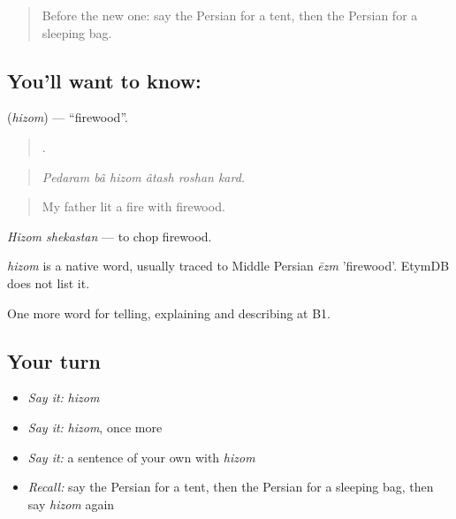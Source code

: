 \label{lesson:FA-C470-hizom}



\begin{quote}
Before the new one: say the Persian for a tent, then the Persian for a sleeping bag.
\end{quote}

\subsection*{You'll want to know: }
\textbf{} (\emph{hizom}) — \textquotedblleft{}firewood\textquotedblright{}.

\begin{quote}
     .
\end{quote}

\begin{quote}
\emph{Pedaram bâ hizom âtash roshan kard.}
\end{quote}

\begin{quote}
My father lit a fire with firewood.
\end{quote}

\emph{Hizom shekastan} — to chop firewood.

\begin{cousinweb}
\emph{hizom} is a native word, usually traced to Middle Persian \emph{ēzm} 'firewood'. EtymDB does not list it.
\end{cousinweb}

\begin{grammarlens}[title={What you've built}]
One more word for telling, explaining and describing at B1.
\end{grammarlens}

\subsection*{Your turn}
\begin{itemize}
\raggedright
  \item \emph{Say it:} \emph{hizom}
  \item \emph{Say it:} \emph{hizom}, once more
  \item \emph{Say it:} a sentence of your own with \emph{hizom}
  \item \emph{Recall:} say the Persian for a tent, then the Persian for a sleeping bag, then say \emph{hizom} again
\end{itemize}

